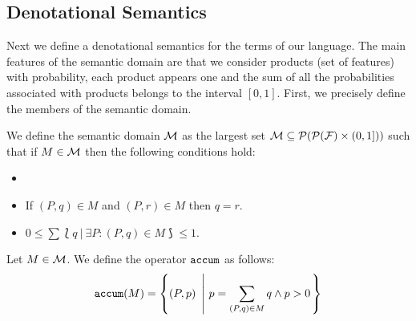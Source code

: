 \subsection{Denotational Semantics}
\label{sec:stat:den}

Next we define a denotational semantics for the terms of our language. The main features of the semantic domain are that we consider products (set of features) with probability,
each product appears one and the sum of all the probabilities associated with products belongs to the interval $[0,1]$. First, we precisely define the members of the semantic domain.



\bdfn\label{def:den:pr}
We define the semantic domain ${\cal M}$ as the largest set ${\cal M}\subseteq{\cal P}({\cal P}({\cal F})\times
  (0,1]))$ such that if $M\in{\cal M}$ then the following
  conditions hold:
  \begin{itemize}
  \item {}
  \item If $(P,q)\in M$ and $(P,r)\in M$ then $q=r$.
  \item $0\leq \sum \lbag q \ | \ \exists P: (P,q)\in M\rbag \leq 1$.
  \end{itemize}


Let $M \in {\cal M}$. 
We define the operator $\mathtt{accum}$ as follows:
  $$\accum(M) = \left\{(P,p)\ \left| \ p=\sum_{(P,q)\in M}q \wedge p>0\right. \right\}$$
\edfn

